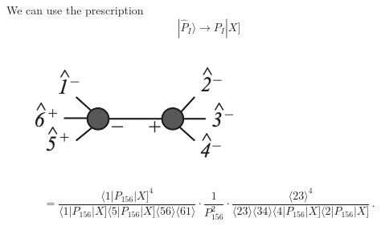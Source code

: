 \documentclass{beamer}
\newcommand{\aket}[1]{|#1\rangle}
\newcommand{\sket}[1]{|#1]}
\begin{document}
\begin{frame}
    We can use the prescription
    \begin{equation*}
        \aket{\hat{P}_I}\rightarrow P_I \sket{X}
    \end{equation*}
    \begin{minipage}{0.38\textwidth}
    \centering
    \includegraphics[width=\textwidth]{FinalNMHV.png}
\end{minipage}
\hfill
\begin{minipage}{0.62\textwidth}
    \centering
    \[
= \frac{\langle 1|P_{156}|X]^4}{\langle 1|P_{156}|X] \langle 5|P_{156}|X] \langle 56\rangle \langle 61\rangle}
\cdot \frac{1}{P_{156}^2}
\cdot \frac{\langle 23\rangle^4}{\langle 23\rangle \langle 34\rangle \langle 4|P_{156}|X] \langle 2|P_{156}|X]} \,.
\]

\end{minipage}

\end{frame}
\end{document}
